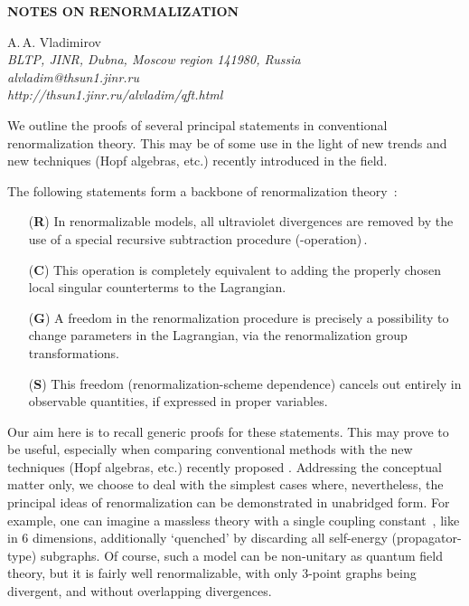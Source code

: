 \documentclass[a4paper,12pt]{article}
\begin{document}
\begin{center}
{\bf NOTES ON RENORMALIZATION}
\end{center}

\vspace*{-.1cm}

\begin{center}
{\sc A.\,A. Vladimirov} \\[.1cm]
{\em BLTP, JINR, Dubna, Moscow region 141980, Russia \\
alvladim@thsun1.jinr.ru \\
http://thsun1.jinr.ru/{}alvladim/qft.html}
\end{center}

\vspace{.7cm}

{\small
We outline the proofs of several principal statements in conventional
renormalization theory. This may be of some use in the light of new trends
and new techniques (Hopf algebras, etc.) recently introduced in the field.
}

\vspace{1cm}

The following statements form a backbone of renormalization theory
\cite{Co}\,:
\begin{itemize}
  \item[(\textbf R)] In renormalizable models, all ultraviolet divergences
are removed by the use of a special recursive subtraction procedure
(\coordHE{}-operation)\,.
  \item[(\textbf C)] This operation is completely equivalent to adding
the properly chosen local singular counterterms to the Lagrangian.
  \item[(\textbf G)] A freedom in the renormalization procedure is
precisely a possibility to change parameters in the
Lagrangian, via the renormalization group transformations.
\item[(\textbf S)] This freedom (renormalization-scheme dependence) cancels
out entirely in observable quantities, if expressed in proper variables.
\end{itemize}

Our aim here is to recall generic proofs for these statements. This may
prove to be useful, especially when comparing conventional methods with the
new techniques (Hopf algebras, etc.) recently proposed \cite{CK}.
Addressing the conceptual matter only, we choose to deal with
the simplest cases where, nevertheless, the principal ideas of renormalization
can be demonstrated in unabridged form. For example, one can imagine a
massless theory with a single coupling constant \coordHE{}\,, like \coordHE{}
in 6 dimensions, additionally `quenched' by discarding all self-energy
(propagator-type) subgraphs. Of course, such a model can be non-unitary as
quantum field theory, but it is fairly well renormalizable, with only
3-point graphs being divergent, and without overlapping divergences.
\end{document}
